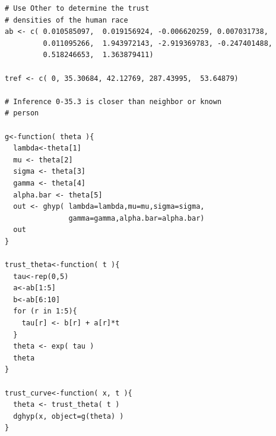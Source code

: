\documentclass{amsart}
\begin{document}
\begin{verbatim}
# Use Other to determine the trust
# densities of the human race
ab <- c( 0.010585097,  0.019156924, -0.006620259, 0.007031738,
         0.011095266,  1.943972143, -2.919369783, -0.247401488,
         0.518246653,  1.363879411)

tref <- c( 0, 35.30684, 42.12769, 287.43995,  53.64879)

# Inference 0-35.3 is closer than neighbor or known
# person

g<-function( theta ){
  lambda<-theta[1]
  mu <- theta[2]
  sigma <- theta[3]
  gamma <- theta[4]
  alpha.bar <- theta[5]
  out <- ghyp( lambda=lambda,mu=mu,sigma=sigma,
               gamma=gamma,alpha.bar=alpha.bar)
  out
}

trust_theta<-function( t ){
  tau<-rep(0,5)
  a<-ab[1:5]
  b<-ab[6:10]
  for (r in 1:5){
    tau[r] <- b[r] + a[r]*t
  }
  theta <- exp( tau )
  theta  
}

trust_curve<-function( x, t ){
  theta <- trust_theta( t )
  dghyp(x, object=g(theta) )
}
\end{verbatim}
\end{document}
